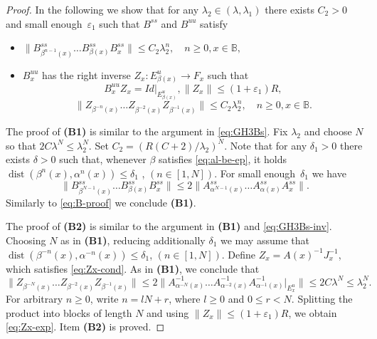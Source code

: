\documentclass[12pt]{article}
\newcommand{\Bb}{\mathbb{B}}
\DeclareMathOperator{\dist}{dist}
\theoremstyle{definition}
\begin{document}
\begin{proof}
In the following we show that for any $\lambda_2 \in (\lambda, \lambda_1)$ there exists $C_2 > 0$ and small enough~$\varepsilon_1$ such that $B^{ss}$ and $B^{uu}$ satisfy 
\begin{itemize}
    \item[\textbf{(B1)}] 
        $
    \|B^{ss}_{\beta^{n-1}(x)} \dots B^{ss}_{\beta(x)}B^{ss}_x\| \leq C_2\lambda_2^n, \quad n \geq 0, x \in \Bb,
    $
\item[\textbf{(B2)}] $B^{uu}_{x}$ has the right inverse $Z_x: E_{\beta(x)}^u \to F_x$ such that 
\begin{equation}\label{eq:Zx-cond}
B^{uu}_{x} Z_x  = Id|_{E_{\beta(x)}^u}, \|Z_x\| \leq (1+\varepsilon_1)R,
\end{equation}
\begin{equation}\label{eq:Zx-exp}
    \|Z_{\beta^{-n}(x)} \dots Z_{\beta^{-2}(x)}Z_{\beta^{-1}(x)}\| \leq C_2\lambda_2^n, \quad n \geq 0, x \in \Bb.
\end{equation}

\end{itemize}

The proof of \textbf{(B1)} is similar to the argument in \eqref{eq:GH3Bs}. Fix $\lambda_2$ and choose $N$ so that $2C\lambda^N \leq \lambda_2^N$. Set $C_2=(R(C+2)/\lambda_2)^N$.
Note that for any $\delta_1 > 0$ there exists $\delta > 0$ such that, whenever $\beta$ satisfies \eqref{eq:al-be-ep}, it holds
$
\dist(\beta^n(x), \alpha^n(x)) \leq \delta_1
$
, $(n \in [1, N])$.
For small enough~$\delta_1$ we have
$$
\|B^{ss}_{\beta^{N-1}(x)} \dots B^{ss}_{\beta(x)}B^{ss}_x\| \leq 2\|A^{ss}_{\alpha^{N-1}(x)} \dots A^{ss}_{\alpha(x)}A^{ss}_x\|.
$$
Similarly to \eqref{eq:B-proof} we conclude \textbf{(B1)}.

The proof of \textbf{(B2)} is similar to the argument in \textbf{(B1)} and \eqref{eq:GH3Bs-inv}. Choosing $N$ as in \textbf{(B1)}, reducing additionally $\delta_1$ we may assume that 
$
\dist(\beta^{-n}(x), \alpha^{-n}(x)) \leq \delta_1
$, $(n \in [1, N])$.
Define $Z_x = A(x)^{-1}J_x^{-1}$, which satisfies \eqref{eq:Zx-cond}. As in \textbf{(B1)}, we conclude that 
$$
\|Z_{\beta^{-N}(x)} \dots Z_{\beta^{-2}(x)}Z_{\beta^{-1}(x)}\| \leq 2 \|A^{-1}_{\alpha^{-N}(x)} \dots A^{-1}_{\alpha^{-2}(x)}A^{-1}_{\alpha^{-1}(x)}|_{E_x^u}\| \leq 2C\lambda^N \leq \lambda_2^N.
$$
For arbitrary $n\geq0$, write $n=lN+r$, where $l\geq0$ and $0\leq r<N$. 
Splitting the product into blocks of length $N$ and using $\|Z_x\|\leq(1+\varepsilon_1)R$, we obtain \eqref{eq:Zx-exp}.
Item \textbf{(B2)} is proved.


\end{proof}
\end{document}
